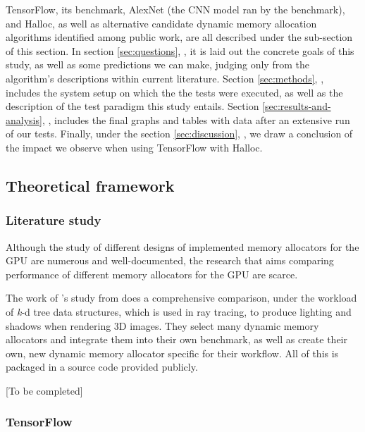 \documentclass[12pt,twoside]{article}
\begin{document}
TensorFlow, its benchmark, AlexNet (the CNN model ran by the benchmark), and Halloc, as well as alternative candidate dynamic memory allocation algorithms identified among public work, are all described under the sub-section \textit{} of this \textit{} section. In section \ref{sec:questions}, \textit{}, it is laid out the concrete goals of this study, as well as some predictions we can make, judging only from the algorithm's descriptions within current literature. Section \ref{sec:methods}, \textit{}, includes the system setup on which the the tests were executed, as well as the description of the test paradigm this study entails. Section \ref{sec:results-and-analysis}, \textit{}, includes the final graphs and tables with data after an extensive run of our tests. Finally, under the section \ref{sec:discussion}, \textit{}, we draw a conclusion of the impact we observe when using TensorFlow with Halloc. 

\subsection{Theoretical framework}
\label{sec:theoretical-framework}

\subsubsection*{Literature study}

Although the study of different designs of implemented memory allocators for the GPU are numerous and well-documented, the research that aims comparing performance of different memory allocators for the GPU are scarce. 

The work of \citeauthor{Vinkler2015}'s study from \citeyear{Vinkler2015} does a comprehensive comparison, under the workload of \textit{k}-d tree data structures, which is used in ray tracing, to produce lighting and shadows when rendering 3D images. They select many dynamic memory allocators and integrate them into their own benchmark, as well as create their own, new dynamic memory allocator specific for their workflow. All of this is packaged in a source code provided publicly.

[To be completed]

\subsubsection*{TensorFlow}
\end{document}
